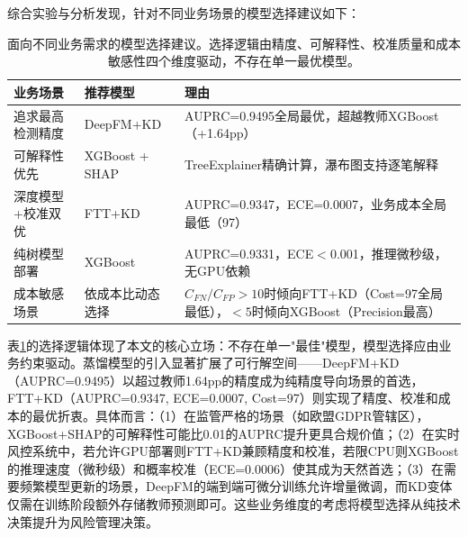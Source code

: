 综合实验与分析发现，针对不同业务场景的模型选择建议如下：

\begin{table}[htbp]
\centering
\caption{面向不同业务需求的模型选择建议。选择逻辑由精度、可解释性、校准质量和成本敏感性四个维度驱动，不存在单一最优模型。}
\label{tab:model_selection}
\begin{tabular}{p{3.2cm}p{3.8cm}p{6.8cm}}
\toprule
\textbf{业务场景} & \textbf{推荐模型} & \textbf{理由} \\
\midrule
追求最高检测精度 & DeepFM+KD & AUPRC=0.9495全局最优，超越教师XGBoost（+1.64pp） \\
可解释性优先 & XGBoost + SHAP & TreeExplainer精确计算，瀑布图支持逐笔解释 \\
深度模型+校准双优 & FTT+KD & AUPRC=0.9347，ECE=0.0007，业务成本全局最低（97） \\
纯树模型部署 & XGBoost & AUPRC=0.9331，ECE$<$0.001，推理微秒级，无GPU依赖 \\
成本敏感场景 & 依成本比动态选择 & $C_{FN}/C_{FP}>10$时倾向FTT+KD（Cost=97全局最低），$<5$时倾向XGBoost（Precision最高） \\
\bottomrule
\end{tabular}
\end{table}

表\ref{tab:model_selection}的选择逻辑体现了本文的核心立场：不存在单一"最佳"模型，模型选择应由业务约束驱动。蒸馏模型的引入显著扩展了可行解空间——DeepFM+KD（AUPRC=0.9495）以超过教师1.64pp的精度成为纯精度导向场景的首选，FTT+KD（AUPRC=0.9347, ECE=0.0007, Cost=97）则实现了精度、校准和成本的最优折衷。具体而言：（1）在监管严格的场景（如欧盟GDPR管辖区），XGBoost+SHAP的可解释性可能比0.01的AUPRC提升更具合规价值；（2）在实时风控系统中，若允许GPU部署则FTT+KD兼顾精度和校准，若限CPU则XGBoost的推理速度（微秒级）和概率校准（ECE=0.0006）使其成为天然首选；（3）在需要频繁模型更新的场景，DeepFM的端到端可微分训练允许增量微调，而KD变体仅需在训练阶段额外存储教师预测即可。这些业务维度的考虑将模型选择从纯技术决策提升为风险管理决策。
